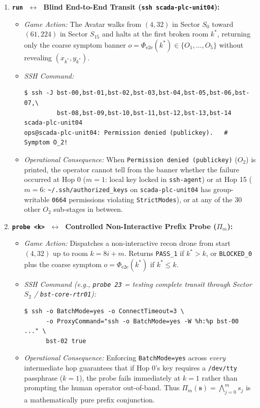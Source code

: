 \documentclass[11pt,a4paper]{article}
\theoremstyle{definition}
\theoremstyle{remark}
\begin{document}
\begin{enumerate}[leftmargin=1.6em]
    \item \textbf{\texttt{run} $\;\longleftrightarrow\;$ Blind End-to-End Transit (\texttt{ssh scada-plc-unit04}):}
    \begin{itemize}
        \item \emph{Game Action:} The Avatar walks from $(4,32)$ in Sector $S_0$ toward $(61,224)$ in Sector $S_{15}$ and halts at the first broken room $k^*$, returning only the coarse symptom banner $o = \Phi_{\text{e2e}}(k^*) \in \{O_1, \dots, O_5\}$ without revealing $(x_{k^*}, y_{k^*})$.
        \item \emph{SSH Command:}
        \begin{lstlisting}[style=c99style]
$ ssh -J bst-00,bst-01,bst-02,bst-03,bst-04,bst-05,bst-06,bst-07,\
         bst-08,bst-09,bst-10,bst-11,bst-12,bst-13,bst-14 scada-plc-unit04
ops@scada-plc-unit04: Permission denied (publickey).   # Symptom O_2!
        \end{lstlisting}
        \item \emph{Operational Consequence:} When \texttt{Permission denied (publickey)} ($O_2$) is printed, the operator cannot tell from the banner whether the failure occurred at Hop 0 ($m=1$: local key locked in \texttt{ssh-agent}) or at Hop 15 ($m=6$: \texttt{\textasciitilde/.ssh/authorized\_keys} on \texttt{scada-plc-unit04} has group-writable \texttt{0664} permissions violating \texttt{StrictModes}), or at any of the 30 other $O_2$ sub-stages in between.
    \end{itemize}

    \item \textbf{\texttt{probe <k>} $\;\longleftrightarrow\;$ Controlled Non-Interactive Prefix Probe ($\Pi_m$):}
    \begin{itemize}
        \item \emph{Game Action:} Dispatches a non-interactive recon drone from start $(4,32)$ up to room $k = 8i + m$. Returns \texttt{PASS\_1} if $k^* > k$, or \texttt{BLOCKED\_0} plus the coarse symptom $o = \Phi_{\text{e2e}}(k^*)$ if $k^* \le k$.
        \item \emph{SSH Command (e.g., \texttt{probe 23} = testing complete transit through Sector $S_2$ / \texttt{bst-core-rtr01}):}
        \begin{lstlisting}[style=c99style]
$ ssh -o BatchMode=yes -o ConnectTimeout=3 \
      -o ProxyCommand="ssh -o BatchMode=yes -W %h:%p bst-00 ..." \
      bst-02 true
        \end{lstlisting}
        \item \emph{Operational Consequence:} Enforcing \texttt{BatchMode=yes} across \emph{every} intermediate hop guarantees that if Hop 0's key requires a \texttt{/dev/tty} passphrase ($k=1$), the probe fails immediately at $k=1$ rather than prompting the human operator out-of-band. Thus $\Pi_m(\bm{s}) = \bigwedge_{j=0}^m s_j$ is a mathematically pure prefix conjunction.
    \end{itemize}


\end{enumerate}
\end{document}
